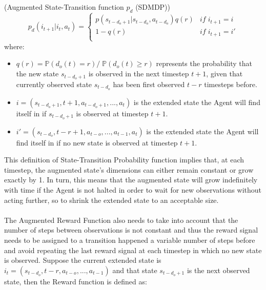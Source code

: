                 \begin{definition}(Augmented State-Transition function $p_d$ (SDMDP))
                    \label{def:sdmdpaugtrans}
                    \[ p_d \left( i_{t+1} | i_t, a_t \right) =  
                        \begin{cases} 
                            p \left( s_{t-d_o+1} | s_{t-d_o}, a_{t-d_o} \right) q\left(r\right) & if \; i_{t+1} = i \\
                            1 - q\left(r\right) & if \; i_{t+1} = i'\\
                        \end{cases}
                    \]
                    where:
                \end{definition}
                \begin{itemize}[topsep=0.5em, partopsep=0.5em]
                    \setlength\itemsep{0em}
                    \item $q(r) = \mathds{P}\left( d_o(t) = r \right) /\; \mathds{P}\left( d_o(t) \geq r \right) $ represents the probability that the new state $s_{t-d_o+1}$ is observed in the next timestep $t+1$, given that currently observed state $s_{t-d_o}$ has been first observed $t-r$ timesteps before.
                    \item $i = \left( s_{t-d_o+1}, t+1, a_{t-d_o+1}, ..., a_{t}\right)$ is the extended state the Agent will find itself in if $s_{t-d_o+1}$ is observed at timestep $t+1$.
                    \item $i' = \left( s_{t-d_o}, t-r+1, a_{t-o}, ..., a_{t-1}, a_{t} \right)$  is the extended state the Agent will find itself in if no new state is observed at timestep $t+1$.
                \end{itemize}
                This definition of State-Transition Probability function implies that, at each timestep, the augmented state's dimensions can either remain constant or grow exactly by 1. In turn, this means that the augmented state will grow indefinitely with time if the Agent is not halted in order to wait for new observations without acting further, so to shrink the extended state to an acceptable size.
                \\\\
                The Augmented Reward Function also needs to take into account that the number of steps between observations is not constant and thus the reward signal needs to be assigned to a transition happened a variable number of steps before and avoid repeating the last reward signal at each timestep in which no new state is observed. Suppose the current extended state is $i_t = \left( s_{t-d_o}, t-r, a_{t-o}, ..., a_{t-1} \right)$ and that state $s_{t-d_o+1}$ is the next observed state, then the Reward function is defined as:
